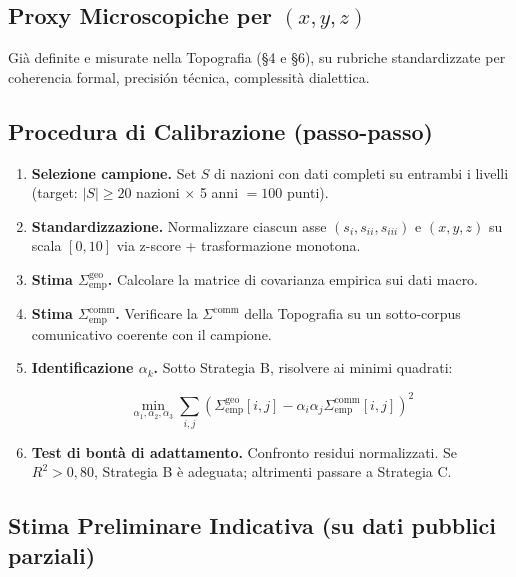 \subsection{\texorpdfstring{Proxy Microscopiche per
\((x, y, z)\)}{Proxy Microscopiche per (x, y, z)}}\label{proxy-microscopiche-per-x-y-z}

Già definite e misurate nella Topografia (\S{}4 e \S{}6), su rubriche
standardizzate per coherencia formal, precisión técnica, complessità
dialettica.

\subsection{Procedura di Calibrazione
(passo-passo)}\label{procedura-di-calibrazione-passo-passo}

\begin{enumerate}
\def\labelenumi{\arabic{enumi}.}
\item
  \textbf{Selezione campione.} Set \(S\) di nazioni con dati completi su
  entrambi i livelli (target: \(|S| \geq 20\) nazioni $\times$ 5 anni \(= 100\)
  punti).
\item
  \textbf{Standardizzazione.} Normalizzare ciascun asse
  \((s_i, s_{ii}, s_{iii})\) e \((x, y, z)\) su scala \([0, 10]\) via
  z-score + trasformazione monotona.
\item
  \textbf{Stima \(\Sigma^{\text{geo}}_{\text{emp}}\).} Calcolare la
  matrice di covarianza empirica sui dati macro.
\item
  \textbf{Stima \(\Sigma^{\text{comm}}_{\text{emp}}\).} Verificare la
  \(\Sigma^{\text{comm}}\) della Topografia su un sotto-corpus
  comunicativo coerente con il campione.
\item
  \textbf{Identificazione \(\alpha_k\).} Sotto Strategia B, risolvere ai
  minimi quadrati:

  \[\min_{\alpha_1, \alpha_2, \alpha_3} \sum_{i, j} \left( \Sigma^{\text{geo}}_{\text{emp}}[i,j] - \alpha_i \alpha_j \Sigma^{\text{comm}}_{\text{emp}}[i,j] \right)^2\]
\item
  \textbf{Test di bontà di adattamento.} Confronto residui normalizzati.
  Se \(R^2 > 0{,}80\), Strategia B è adeguata; altrimenti passare a
  Strategia C.
\end{enumerate}

\subsection{Stima Preliminare Indicativa (su dati pubblici
parziali)}\label{stima-preliminare-indicativa-su-dati-pubblici-parziali}

